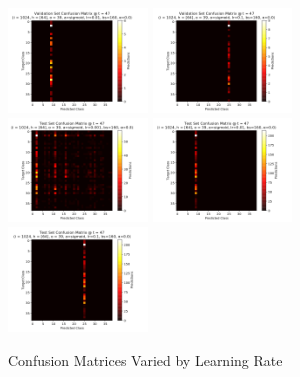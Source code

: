 \documentclass[10pt,epsf]{article}
\begin{document}
{{\begin{figure}[H]
      \includegraphics[width=0.33\textwidth]{./img/64-0.01-160-0-sigmoid-1/confusion-matrix-validation-47.png}
      \includegraphics[width=0.33\textwidth]{./img/64-0.1-160-0-sigmoid-1/confusion-matrix-validation-47.png}
      \includegraphics[width=0.33\textwidth]{./img/64-0.001-160-0-sigmoid-1/confusion-matrix-test-47.png}
      \includegraphics[width=0.33\textwidth]{./img/64-0.01-160-0-sigmoid-1/confusion-matrix-test-47.png}
      \includegraphics[width=0.33\textwidth]{./img/64-0.1-160-0-sigmoid-1/confusion-matrix-test-47.png}
      \caption{Confusion Matrices Varied by Learning Rate}
      \label{fig:cm-by-lr}
    \end{figure}
}}
\end{document}
